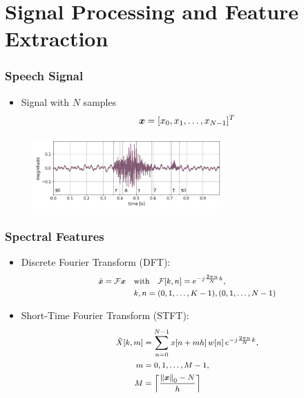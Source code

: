 
\section{Signal Processing and Feature Extraction}
\begin{frame}
  \frametitle{Speech Signal}
  \begin{itemize}
    \item Signal with $N$ samples
    \begin{equation*}\label{eq:signal_raw_x}
      \footnotesize
      \bm{x} = [x_0, x_1, \dots, x_{N-1}]^T
    \end{equation*}
  \end{itemize}
  \begin{figure} \includegraphics[width=0.65\textwidth]{../3_signal/figs/signal_raw_showcase_right0.png} \end{figure}
\end{frame}

\begin{frame}
  \frametitle{Spectral Features}
  \vspace{-0.5cm}
  \begin{itemize}
    \item Discrete Fourier Transform (DFT):
    \begin{equation*}\label{eq:signal_spec_dtft_matrix}
      \footnotesize
      \begin{aligned}
        \hat{\bm{x}} = \mathcal{F} \bm{x} \quad & \mathrm{with} 
        \quad \mathcal{F}[k, n] = e^{-j\frac{2 \pi n}{N} k},\\
        &k, n = (0, 1, \dots, K-1), (0, 1, \dots, N-1)
      \end{aligned}
    \end{equation*}

    \item Short-Time Fourier Transform (STFT):
    \begin{equation*}\label{eq:signal_spec_stft}
      \footnotesize
      \begin{aligned}
        \tilde{X}[k, m] &= \sum_{n=0}^{N-1} x[n + m h] \, w[n] \, e^{-j\frac{2 \pi n}{N}k},\\ 
        m &= 0, 1, \dots, M - 1,\\
        M &= \ceil*{\frac{\norm{\bm{x}}_0-N}{h}}
      \end{aligned}
    \end{equation*}
  \end{itemize}
\end{frame}

